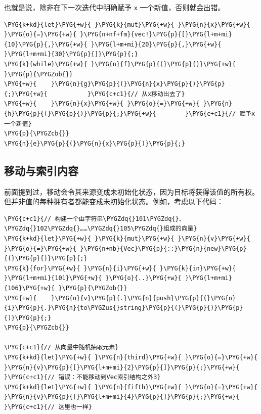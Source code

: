 也就是说，除非在下一次迭代中明确赋予 \texttt{x} 一个新值，否则就会出错。

\begin{Verbatim}[commandchars=\\\{\},breaklines=true,breakanywhere=true,fontsize=\codefont,xleftmargin=17bp]
\PYG{k+kd}{let}\PYG{+w}{ }\PYG{k}{mut}\PYG{+w}{ }\PYG{n}{x}\PYG{+w}{ }\PYG{o}{=}\PYG{+w}{ }\PYG{n+nf+fm}{vec!}\PYG{p}{[}\PYG{l+m+mi}{10}\PYG{p}{,}\PYG{+w}{ }\PYG{l+m+mi}{20}\PYG{p}{,}\PYG{+w}{ }\PYG{l+m+mi}{30}\PYG{p}{]}\PYG{p}{;}
\PYG{k}{while}\PYG{+w}{ }\PYG{n}{f}\PYG{p}{(}\PYG{p}{)}\PYG{+w}{ }\PYG{p}{\PYGZob{}}
\PYG{+w}{    }\PYG{n}{g}\PYG{p}{(}\PYG{n}{x}\PYG{p}{)}\PYG{p}{;}\PYG{+w}{           }\PYG{c+c1}{// 从x移动出去了}
\PYG{+w}{    }\PYG{n}{x}\PYG{+w}{ }\PYG{o}{=}\PYG{+w}{ }\PYG{n}{h}\PYG{p}{(}\PYG{p}{)}\PYG{p}{;}\PYG{+w}{        }\PYG{c+c1}{// 赋予x一个新值}
\PYG{p}{\PYGZcb{}}
\PYG{n}{e}\PYG{p}{(}\PYG{n}{x}\PYG{p}{)}\PYG{p}{;}
\end{Verbatim}

\subsection{移动与索引内容}

前面提到过，移动会令其来源变成未初始化状态，因为目标将获得该值的所有权。但并非值的每种拥有者都能变成未初始化状态。例如，考虑以下代码：

\begin{Verbatim}[commandchars=\\\{\},breaklines=true,breakanywhere=true,fontsize=\codefont,xleftmargin=17bp]
\PYG{c+c1}{// 构建一个由字符串\PYGZdq{}101\PYGZdq{}、\PYGZdq{}102\PYGZdq{}……\PYGZdq{}105\PYGZdq{}组成的向量}
\PYG{k+kd}{let}\PYG{+w}{ }\PYG{k}{mut}\PYG{+w}{ }\PYG{n}{v}\PYG{+w}{ }\PYG{o}{=}\PYG{+w}{ }\PYG{n+nb}{Vec}\PYG{p}{::}\PYG{n}{new}\PYG{p}{(}\PYG{p}{)}\PYG{p}{;}
\PYG{k}{for}\PYG{+w}{ }\PYG{n}{i}\PYG{+w}{ }\PYG{k}{in}\PYG{+w}{ }\PYG{l+m+mi}{101}\PYG{+w}{ }\PYG{o}{..}\PYG{+w}{ }\PYG{l+m+mi}{106}\PYG{+w}{ }\PYG{p}{\PYGZob{}}
\PYG{+w}{    }\PYG{n}{v}\PYG{p}{.}\PYG{n}{push}\PYG{p}{(}\PYG{n}{i}\PYG{p}{.}\PYG{n}{to\PYGZus{}string}\PYG{p}{(}\PYG{p}{)}\PYG{p}{)}\PYG{p}{;}
\PYG{p}{\PYGZcb{}}

\PYG{c+c1}{// 从向量中随机抽取元素}
\PYG{k+kd}{let}\PYG{+w}{ }\PYG{n}{third}\PYG{+w}{ }\PYG{o}{=}\PYG{+w}{ }\PYG{n}{v}\PYG{p}{[}\PYG{l+m+mi}{2}\PYG{p}{]}\PYG{p}{;}\PYG{+w}{ }\PYG{c+c1}{// 错误：不能移动到Vec索引结构之外3}
\PYG{k+kd}{let}\PYG{+w}{ }\PYG{n}{fifth}\PYG{+w}{ }\PYG{o}{=}\PYG{+w}{ }\PYG{n}{v}\PYG{p}{[}\PYG{l+m+mi}{4}\PYG{p}{]}\PYG{p}{;}\PYG{+w}{ }\PYG{c+c1}{// 这里也一样}
\end{Verbatim}

